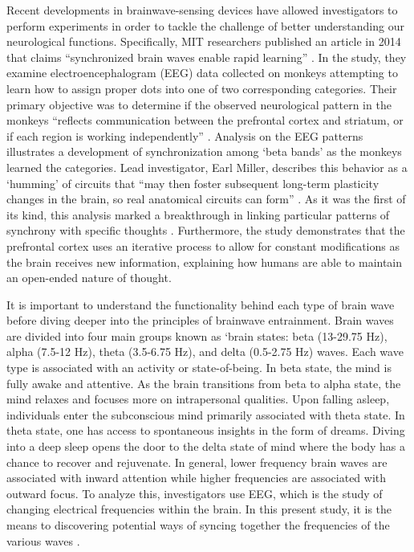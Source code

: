 \documentclass{article}[12pt]
\begin{document}
Recent developments in brainwave-sensing devices have allowed investigators to perform experiments in order to tackle the challenge of better understanding our neurological functions. Specifically, MIT researchers published an article in 2014 that claims ``synchronized brain waves enable rapid learning'' \cite{trafton}. In the study, they examine electroencephalogram (EEG) data collected on monkeys attempting to learn how to assign proper dots into one of two corresponding categories.  Their primary objective was to determine if the observed neurological pattern in the monkeys ``reflects communication between the prefrontal cortex and striatum, or if each region is working independently'' \cite{trafton}. Analysis on the EEG patterns illustrates a development of synchronization among ‘beta bands’ as the monkeys learned the categories. Lead investigator, Earl Miller, describes this behavior as a ‘humming’ of circuits that ``may then foster subsequent long-term plasticity changes in the brain, so real anatomical circuits can form'' \cite{trafton}. As it was the first of its kind, this analysis marked a breakthrough in linking particular patterns of synchrony with specific thoughts \cite{trafton}. Furthermore, the study demonstrates that the prefrontal cortex uses an iterative process to allow for constant modifications as the brain receives new information, explaining how humans are able to maintain an open-ended nature of thought.

It is important to understand the functionality behind each type of brain wave before diving deeper into the principles of brainwave entrainment. Brain waves are divided into four main groups known as ‘brain states: beta (13-29.75 Hz), alpha (7.5-12 Hz),  theta (3.5-6.75 Hz), and delta (0.5-2.75 Hz) waves. Each wave type is associated with an activity or state-of-being. In beta state, the mind is fully awake and attentive. As the brain transitions from beta to alpha state, the mind relaxes and focuses more on intrapersonal qualities. Upon falling asleep, individuals enter the subconscious mind primarily associated with theta state. In theta state, one has access to spontaneous insights in the form of dreams.  Diving into a deep sleep opens the door to the delta state of mind where the body has a chance to recover and rejuvenate.
In general, lower frequency brain waves are associated with inward attention while higher frequencies are associated with outward focus. To analyze this, investigators use EEG, which is the study of  changing electrical frequencies within the brain. In this present study, it is the means to discovering potential ways of syncing together the frequencies of the various waves \cite{Giorgio}.  
\end{document}

